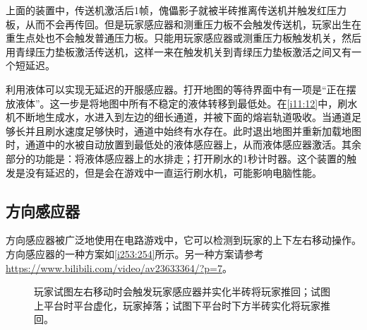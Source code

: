 上面的装置中，传送机激活后1帧，傀儡影子就被半砖推离传送机并触发红压力板，从而不会再传回。但是玩家感应器和测重压力板不会触发传送机，玩家出生在重生点处也不会触发普通压力板。只能用玩家感应器或测重压力板触发机关，然后用青绿压力垫板激活传送机，这样一来在触发机关到青绿压力垫板激活之间又有一个短延迟。

利用液体可以实现无延迟的开服感应器。打开地图的等待界面中有一项是“正在摆放液体”。这一步是将地图中所有不稳定的液体转移到最低处。在\autoref{i11:12}中，刷水机不断地生成水，水进入到左边的细长通道，并被下面的熔岩轨道吸收。当通道足够长并且刷水速度足够快时，通道中始终有水存在。此时退出地图并重新加载地图时，通道中的水被自动放置到最低处的液体感应器上，从而液体感应器激活。其余部分的功能是：将液体感应器上的水排走；打开刷水的1秒计时器。这个装置的触发是没有延迟的，但是会在游戏中一直运行刷水机，可能影响电脑性能。

\subsection{方向感应器}
方向感应器被广泛地使用在电路游戏中，它可以检测到玩家的上下左右移动操作。方向感应器的一种方案如\autoref{i253:254}所示。另一种方案请参考\url{https://www.bilibili.com/video/av23633364/?p=7}。

\begin{figure}[!ht]
\begin{center}
\qquad
{}
\end{center}
\caption{玩家试图左右移动时会触发玩家感应器并实化半砖将玩家推回；试图上平台时平台虚化，玩家掉落；试图下平台时下方半砖实化将玩家推回。}
\label{i253:254}
\end{figure}

